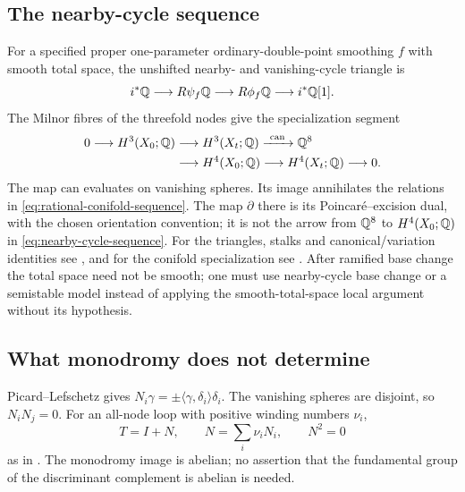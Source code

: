 \subsection{The nearby-cycle sequence}

For a specified proper one-parameter
ordinary-double-point smoothing $f$ with
smooth total space, the unshifted nearby-
and vanishing-cycle triangle is
\[
 i^*\mathbb Q\longrightarrow R\psi_f\mathbb Q
 \longrightarrow R\phi_f\mathbb Q
 \longrightarrow i^*\mathbb Q[1].
\]
The Milnor fibres of the threefold nodes
give the specialization segment
\begin{equation}\label{eq:nearby-cycle-sequence}
 \begin{aligned}
 0\longrightarrow H^3(X_0;\mathbb Q)
 &\longrightarrow H^3(X_t;\mathbb Q)
 \xrightarrow{\ \mathrm{can}\ }\mathbb Q^8\\
 &\longrightarrow H^4(X_0;\mathbb Q)
 \longrightarrow H^4(X_t;\mathbb Q)\longrightarrow0.
 \end{aligned}
\end{equation}
The map $\mathrm{can}$ evaluates on vanishing
spheres. Its image annihilates the relations
in \eqref{eq:rational-conifold-sequence}.
The map $\partial$ there is its
Poincaré--excision dual, with the chosen
orientation convention; it is not the arrow
from $\mathbb Q^8$ to $H^4(X_0;\mathbb Q)$ in
\eqref{eq:nearby-cycle-sequence}.
For the triangles, stalks and canonical/variation
identities see \cite[Section~3]{massey}, and
for the conifold specialization see
\cite[Section~1]{lee-lin-wang}.
After ramified base change the total space
need not be smooth; one must use nearby-cycle
base change or a semistable model instead of
applying the smooth-total-space local argument
without its hypothesis.

\subsection{What monodromy does not determine}

Picard--Lefschetz gives
$N_i\gamma=\pm\langle\gamma,\delta_i\rangle\delta_i$.
The vanishing spheres are disjoint, so
$N_iN_j=0$. For an all-node loop with
positive winding numbers $\nu_i$,
\begin{equation}\label{eq:all-node-monodromy}
 T=I+N,\qquad N=\sum_i\nu_iN_i,\qquad N^2=0
\end{equation}
as in \cite[Section~3.3, equation (3.4)]{lee-lin-wang}.
The monodromy image is abelian; no assertion
that the fundamental group of the
discriminant complement is abelian is needed.

